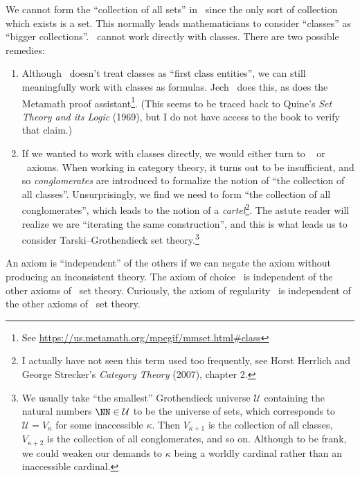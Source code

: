 \begin{node}[Axioms]
\begin{node}[Remarks]
\begin{node}[Classes]\label{set:zfc-000F}%
We cannot form the ``collection of all sets'' in \ZFC\ since the only
sort of collection which exists is a set. This normally leads
mathematicians to consider ``classes'' as ``bigger collections''.
\ZFC\ cannot work directly with classes. There are two possible
remedies:
\begin{enumerate}
\item Although \ZFC\ doesn't treat classes as ``first class entities'',
we can still meaningfully work with classes as formulas. Jech~\cite{jech2003set}
does this, as does the Metamath proof assistant\footnote{See \url{https://us.metamath.org/mpegif/mmset.html\#class}}. (This seems to be
traced back to Quine's \textit{Set Theory and its Logic} (1969), but I
do not have access to the book to verify that claim.)
\item If we wanted to work with classes directly, we would either turn to
\NBG~ or \MK\ axioms. When working in category theory,
it turns out to be insufficient, and so \emph{conglomerates} are
introduced to formalize the notion of ``the collection of all classes''.
Unsurprisingly, we find we need to form ``the collection of all conglomerates'',
which leads to the notion of a \emph{cartel}\footnote{I actually have
not seen this term used too frequently, see Horst Herrlich and George
Strecker's \textit{Category Theory} (2007), chapter 2.}. The astute reader will
realize we are ``iterating the same construction'', and this is what
leads us to consider Tarski--Grothendieck set theory.\footnote{We
usually take ``the smallest'' Grothendieck universe $\mathcal{U}$
containing the natural numbers $\NN\in\mathcal{U}$ to be the universe of
sets, which corresponds to $\mathcal{U}=V_{\kappa}$ for some inaccessible
$\kappa$. Then $V_{\kappa+1}$ is the collection of all classes,
$V_{\kappa+2}$ is the collection of all conglomerates, and so
on. Although to be frank, we could weaken our demands to $\kappa$ being
a worldly cardinal rather than an inaccessible cardinal.}
\end{enumerate}
\end{node} %

\begin{node}\label{set:zfc-000I}%
An axiom is ``independent'' of the others if we can negate the axiom
without producing an inconsistent theory.
The axiom of choice~ is independent of the other
axioms of \ZF\ set theory. Curiously, the axiom of
regularity~ is independent of the other axioms of
\ZF\ set theory.


\end{node}
\end{node}
\end{node}
